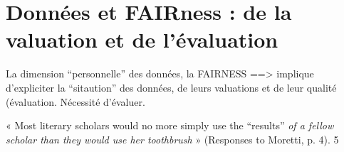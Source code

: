 \chapter{Données et FAIRness : de la valuation et de l'évaluation}

La dimension \enquote{personnelle} des données, la FAIRNESS ==> implique d'expliciter la \enquote{sitaution} des données, de leurs valuations et de leur qualité (évaluation. Nécessité d'évaluer. 

« Most literary scholars would no more simply use the “results” \emph{of a fellow scholar than they would use her toothbrush} » (Responses to Moretti, p. 4). 5
